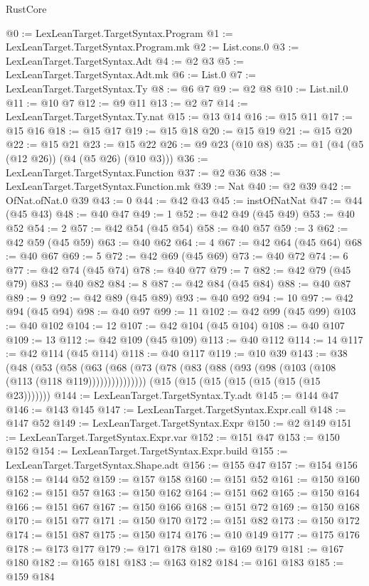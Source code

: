 \begin{lexlean}{RustCore}
\begin{coremodule}
@0 := LexLeanTarget.TargetSyntax.Program
@1 := LexLeanTarget.TargetSyntax.Program.mk
@2 := List.cons.{0}
@3 := LexLeanTarget.TargetSyntax.Adt
@4 := @2 @3
@5 := LexLeanTarget.TargetSyntax.Adt.mk
@6 := List.{0}
@7 := LexLeanTarget.TargetSyntax.Ty
@8 := @6 @7
@9 := @2 @8
@10 := List.nil.{0}
@11 := @10 @7
@12 := @9 @11
@13 := @2 @7
@14 := LexLeanTarget.TargetSyntax.Ty.nat
@15 := @13 @14
@16 := @15 @11
@17 := @15 @16
@18 := @15 @17
@19 := @15 @18
@20 := @15 @19
@21 := @15 @20
@22 := @15 @21
@23 := @15 @22
@26 := @9 @23 (@10 @8)
@35 := @1 (@4 (@5 (@12 @26)) (@4 (@5 @26) (@10 @3)))
@36 := LexLeanTarget.TargetSyntax.Function
@37 := @2 @36
@38 := LexLeanTarget.TargetSyntax.Function.mk
@39 := Nat
@40 := @2 @39
@42 := OfNat.ofNat.{0} @39
@43 := 0
@44 := @42 @43
@45 := instOfNatNat
@47 := @44 (@45 @43)
@48 := @40 @47
@49 := 1
@52 := @42 @49 (@45 @49)
@53 := @40 @52
@54 := 2
@57 := @42 @54 (@45 @54)
@58 := @40 @57
@59 := 3
@62 := @42 @59 (@45 @59)
@63 := @40 @62
@64 := 4
@67 := @42 @64 (@45 @64)
@68 := @40 @67
@69 := 5
@72 := @42 @69 (@45 @69)
@73 := @40 @72
@74 := 6
@77 := @42 @74 (@45 @74)
@78 := @40 @77
@79 := 7
@82 := @42 @79 (@45 @79)
@83 := @40 @82
@84 := 8
@87 := @42 @84 (@45 @84)
@88 := @40 @87
@89 := 9
@92 := @42 @89 (@45 @89)
@93 := @40 @92
@94 := 10
@97 := @42 @94 (@45 @94)
@98 := @40 @97
@99 := 11
@102 := @42 @99 (@45 @99)
@103 := @40 @102
@104 := 12
@107 := @42 @104 (@45 @104)
@108 := @40 @107
@109 := 13
@112 := @42 @109 (@45 @109)
@113 := @40 @112
@114 := 14
@117 := @42 @114 (@45 @114)
@118 := @40 @117
@119 := @10 @39
@143 := @38
    (@48
      (@53 (@58 (@63 (@68 (@73 (@78 (@83 (@88 (@93 (@98 (@103 (@108 (@113 (@118 @119)))))))))))))))
    (@15 (@15 (@15 (@15 (@15 (@15 (@15 @23)))))))
@144 := LexLeanTarget.TargetSyntax.Ty.adt
@145 := @144 @47
@146 := @143 @145
@147 := LexLeanTarget.TargetSyntax.Expr.call
@148 := @147 @52
@149 := LexLeanTarget.TargetSyntax.Expr
@150 := @2 @149
@151 := LexLeanTarget.TargetSyntax.Expr.var
@152 := @151 @47
@153 := @150 @152
@154 := LexLeanTarget.TargetSyntax.Expr.build
@155 := LexLeanTarget.TargetSyntax.Shape.adt
@156 := @155 @47
@157 := @154 @156
@158 := @144 @52
@159 := @157 @158
@160 := @151 @52
@161 := @150 @160
@162 := @151 @57
@163 := @150 @162
@164 := @151 @62
@165 := @150 @164
@166 := @151 @67
@167 := @150 @166
@168 := @151 @72
@169 := @150 @168
@170 := @151 @77
@171 := @150 @170
@172 := @151 @82
@173 := @150 @172
@174 := @151 @87
@175 := @150 @174
@176 := @10 @149
@177 := @175 @176
@178 := @173 @177
@179 := @171 @178
@180 := @169 @179
@181 := @167 @180
@182 := @165 @181
@183 := @163 @182
@184 := @161 @183
@185 := @159 @184

\end{coremodule}
\end{lexlean}
